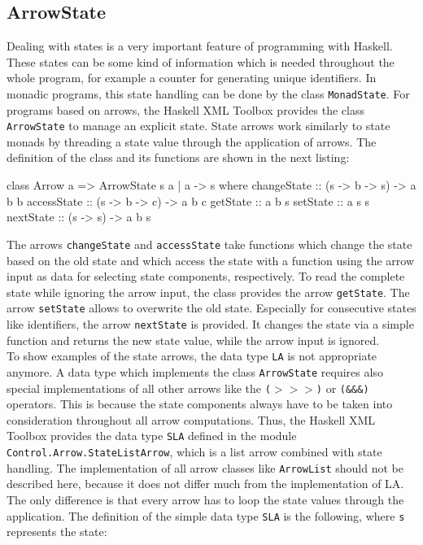 \documentclass[11pt,a4paper,headsepline, bibtotoc]{scrreprt}
\begin{document}
\subsection{ArrowState}
Dealing with states is a very important feature of programming with Haskell. These states can be some kind of information which is needed throughout the whole program, for example a counter for generating unique identifiers. In monadic programs, this state handling can be done by the class \texttt{MonadState}. For programs based on arrows, the Haskell XML Toolbox provides the class \texttt{ArrowState} to manage an explicit state. State arrows work similarly to state monads by threading a state value through the application of arrows. The definition of the class and its functions are shown in the next listing:
\begin{code}
class Arrow a => ArrowState s a | a -> s where
    changeState :: (s -> b -> s) -> a b b
    accessState :: (s -> b -> c) -> a b c
    getState    :: a b s
    setState    :: a s s
    nextState   :: (s -> s) -> a b s
\end{code}
The arrows \texttt{changeState} and \texttt{accessState} take functions which change the state based on the old state and which access the state with a function using the arrow input as data for selecting state components, respectively. To read the complete state while ignoring the arrow input, the class provides the arrow \texttt{getState}. The arrow \texttt{setState} allows to overwrite the old state. Especially for consecutive states like identifiers, the arrow \texttt{nextState} is provided. It changes the state via a simple function and returns the new state value, while the arrow input is ignored.\\
To show examples of the state arrows, the data type \texttt{LA} is not appropriate anymore. A data type which implements the class \texttt{ArrowState} requires also special implementations of all other arrows like the {\tt ($>$$>$$>$)} or {\tt (\&\&\&)} operators. This is because the state components always have to be taken into consideration throughout all arrow computations. Thus, the Haskell XML Toolbox provides the data type \texttt{SLA} defined in the module \texttt{Control.Arrow.StateListArrow}, which is a list arrow combined with state handling. The implementation of all arrow classes like \texttt{ArrowList} should not be described here, because it does not differ much from the implementation of LA. The only difference is that every arrow has to loop the state values through the application. The definition of the simple data type \texttt{SLA} is the following, where \texttt{s} represents the state:
\end{document}
